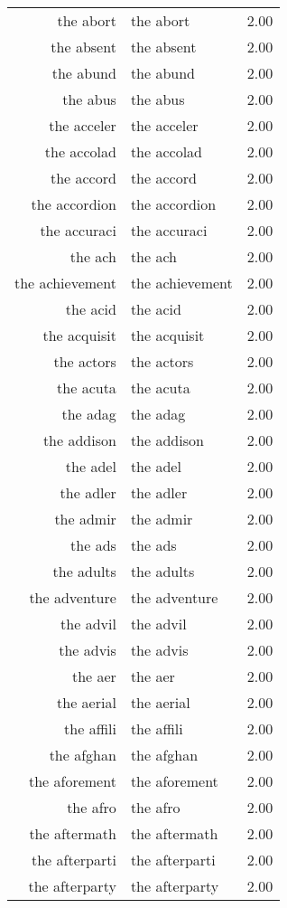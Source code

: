 \begin{table}[ht]
\begin{tabular}{rlr}
  the abort & the abort & 2.00 \\ 
  the absent & the absent & 2.00 \\ 
  the abund & the abund & 2.00 \\ 
  the abus & the abus & 2.00 \\ 
  the acceler & the acceler & 2.00 \\ 
  the accolad & the accolad & 2.00 \\ 
  the accord & the accord & 2.00 \\ 
  the accordion & the accordion & 2.00 \\ 
  the accuraci & the accuraci & 2.00 \\ 
  the ach & the ach & 2.00 \\ 
  the achievement & the achievement & 2.00 \\ 
  the acid & the acid & 2.00 \\ 
  the acquisit & the acquisit & 2.00 \\ 
  the actors & the actors & 2.00 \\ 
  the acuta & the acuta & 2.00 \\ 
  the adag & the adag & 2.00 \\ 
  the addison & the addison & 2.00 \\ 
  the adel & the adel & 2.00 \\ 
  the adler & the adler & 2.00 \\ 
  the admir & the admir & 2.00 \\ 
  the ads & the ads & 2.00 \\ 
  the adults & the adults & 2.00 \\ 
  the adventure & the adventure & 2.00 \\ 
  the advil & the advil & 2.00 \\ 
  the advis & the advis & 2.00 \\ 
  the aer & the aer & 2.00 \\ 
  the aerial & the aerial & 2.00 \\ 
  the affili & the affili & 2.00 \\ 
  the afghan & the afghan & 2.00 \\ 
  the aforement & the aforement & 2.00 \\ 
  the afro & the afro & 2.00 \\ 
  the aftermath & the aftermath & 2.00 \\ 
  the afterparti & the afterparti & 2.00 \\ 
  the afterparty & the afterparty & 2.00 \\ 

\end{tabular}
\end{table}
